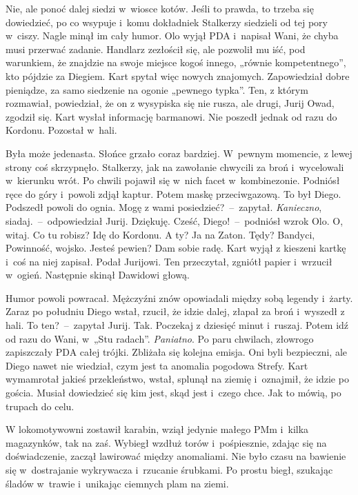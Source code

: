 \documentclass[../MAIN.tex]{subfiles}
\begin{document}
\xx Nie, ale ponoć dalej siedzi w~wiosce kotów.
\xx Jeśli to prawda, to trzeba się dowiedzieć, po co wsypuje i~komu dokładnie\3k
\qm
Stalkerzy siedzieli od tej pory w~ciszy. Nagle minął im cały humor. Olo wyjął PDA i~napisał Wani, że chyba musi przerwać zadanie. Handlarz zezłościł się, ale pozwolił mu iść, pod warunkiem, że znajdzie na swoje miejsce kogoś innego, „równie kompetentnego”, kto pójdzie za Diegiem. Kart spytał więc nowych znajomych. Zapowiedział dobre pieniądze, za samo siedzenie na ogonie „pewnego typka”. Ten, z którym rozmawiał, powiedział, że on z wysypiska się nie rusza, ale drugi, Jurij Owad, zgodził się. Kart wysłał informację barmanowi. Nie poszedł jednak od razu do Kordonu. Pozostał w~hali.

Była może jedenasta. Słońce grzało coraz bardziej. W~pewnym momencie, z lewej strony coś skrzypnęło. Stalkerzy, jak na zawołanie chwycili za broń i~wycelowali w~kierunku wrót. Po chwili pojawił się w~nich facet w~kombinezonie. Podniósł ręce do góry i~powoli zdjął kaptur. Potem maskę przeciwgazową. To był Diego. Podszedł powoli do ognia.
\sx Mogę z wami posiedzieć?~--~zapytał.
\xx \textit{Kanieczno}, siadaj.~--~odpowiedział Jurij.
\xx Dziękuję.
\xx Cześć, Diego!~--~podniósł wzrok Olo.
\xx O, witaj. Co tu robisz?
\xx Idę do Kordonu. A ty?
\xx Ja na Zaton.
\xx Tędy? Bandyci, Powinność, wojsko. Jesteś pewien?
\xx Dam sobie radę.
\qm
Kart wyjął z kieszeni kartkę i~coś na niej zapisał. Podał Jurijowi. Ten przeczytał, zgniótł papier i~wrzucił w~ogień. Następnie skinął Dawidowi głową.

Humor powoli powracał. Mężczyźni znów opowiadali między sobą legendy i~żarty. Zaraz po południu Diego wstał, rzucił, że idzie dalej, złapał za broń i~wyszedł z hali.
\sx To ten?~--~zapytał Jurij.
\xx Tak. Poczekaj z dziesięć minut i~ruszaj. Potem idź od razu do Wani, w~„Stu radach”.
\xx \textit{Paniatno}.
\qm
Po paru chwilach, złowrogo zapiszczały PDA całej trójki. Zbliżała się kolejna emisja. Oni byli bezpieczni, ale Diego nawet nie wiedział, czym jest ta anomalia pogodowa Strefy. Kart wymamrotał jakieś przekleństwo, wstał, splunął na ziemię i~oznajmił, że idzie po gościa. Musiał dowiedzieć się kim jest, skąd jest i~czego chce. Jak to mówią, po trupach do celu.

W lokomotywowni zostawił karabin, wziął jedynie małego PMm i~kilka magazynków, tak na zaś. Wybiegł wzdłuż torów i~pośpiesznie, zdając się na doświadczenie, zaczął lawirować między anomaliami. Nie było czasu na bawienie się w~dostrajanie wykrywacza i~rzucanie śrubkami. Po prostu biegł, szukając śladów w~trawie i~unikając ciemnych plam na ziemi.
\end{document}
